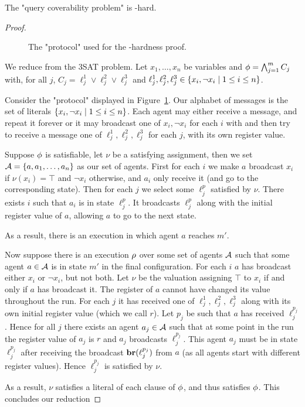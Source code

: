 \begin{proposition}
	The "query coverability problem" is \np-hard.
\end{proposition}

\begin{proof}
	\begin{figure}[h]
		
		\label{fig:np-hard}
		\caption{The "protocol" used for the \np-hardness proof.}
	\end{figure}
	
	We reduce from the 3SAT problem.
	Let $x_1, \ldots, x_n$ be variables and $\phi = \bigwedge_{j=1}^m C_j$ with, for all $j$, $C_j = \ell_j^1 \lor \ell_j^2 \lor \ell_j^3$ and $\ell_j^1, \ell_j^2, \ell_j^3 \in \{x_i, \neg x_i \mid 1 \leq i \leq n\}$. 

	Consider the "protocol" displayed in Figure~\ref{fig:np-hard}.
	Our alphabet of messages is the set of literals $\{x_i, \neg x_i \mid 1 \leq i \leq n\}$.
	Each agent may either receive a message, and repeat it forever or it may broadcast one of $x_i, \neg x_i$ for each $i$ with and then try to receive a message one of $\ell_j^1, \ell_j^2, \ell_j^3$ for each $j$, with its own register value.
	
	Suppose $\phi$ is satisfiable, let $\nu$ be a satisfying assignment, then we set $\mathcal{A} = \{a, a_1, \ldots, a_n\}$ as our set of agents. First for each $i$ we make $a$ broadcast $x_i$ if $\nu(x_i)= \top$ and $\neg x_i$ otherwise, and $a_i$ only receive it (and go to the corresponding state).
	Then for each $j$ we select some $\ell_j^p$ satisfied by $\nu$. There exists $i$ such that $a_i$ is in state $\ell_j^p$. It broadcasts $\ell_j^p$ along with the initial register value of $a$, allowing $a$ to go to the next state.
	
	As a result, there is an execution in which agent $a$ reaches $m'$.
	
	Now suppose there is an execution $\rho$ over some set of agents $\mathcal{A}$ such that some agent $a \in \mathcal{A}$ is in state $m'$ in the final configuration.
	For each $i$ $a$ has broadcast either $x_i$ or $\neg x_i$, but not both.
	Let $\nu$ be the valuation assigning $\top$ to $x_i$ if and only if $a$ has broadcast it.
	The register of $a$ cannot have changed its value throughout the run. 
	For each $j$ it has received one of $\ell_j^1, \ell_j^2, \ell_j^3$ along with its own initial register value (which we call $r$). Let $p_j$ be such that $a$ has received $\ell_j^{p_j}$.
	Hence for all $j$ there exists an agent $a_j \in \mathcal{A}$ such that at some point in the run the register value of $a_j$ is $r$ and $a_j$ broadcasts $\ell_j^{p_j}$.
	This agent $a_j$ must be in state $\ell_j^{p_j}$ after receiving the broadcast $\textbf{br}(\ell_j^{p_j})$ from $a$ (as all agents start with different register values).
	Hence $\ell_j^{p_j}$ is satisfied by $\nu$. 
	
	As a result, $\nu$ satisfies a literal of each clause of $\phi$, and thus satisfies $\phi$. This concludes our reduction
\end{proof}
